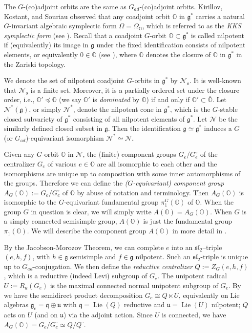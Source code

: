 \documentclass[11pt, a4paper]{amsart}
\newcommand{\g}{\mathfrak{g}}
\newcommand{\orb}{\mathbb{O}}
\newcommand{\fg}{\mathfrak{g}}
\newcommand{\fq}{\mathfrak{q}}
\newcommand{\fu}{\mathfrak{u}}
\newcommand{\cN}{\mathcal{N}}
\DeclareMathOperator{\Lie}{Lie}
\newcommand{\slf}{\mathfrak{sl}}
\theoremstyle{definition}
\numberwithin{equation}{section}
\begin{document}
The $G$-(co)adjoint orbits are the same as $G_{ad}$-(co)adjoint orbits. Kirillov, Kostant, and Souriau observed that any coadjoint orbit $\orb$ in $\fg^*$ carries a natural $G$-invariant algebraic symplectic form $\Omega=\Omega_\orb$, which is referred to as the \emph{KKS symplectic form} (see \cite[(5.14)(b)]{Vogan_AV}). Recall that a coadjoint $G$-orbit $\orb\subset\g^*$ is called nilpotent if (equivalently) its image in $\g$ under the fixed identification consists of nilpotent elements, or equivalently $0\in\overline{\orb}$ (see \cite[Theorem 5.7]{Vogan_AV}), where $\overline{\orb}$ denotes the closure of $\orb$ in $\g^*$ in the Zariski topology. 

We denote the set of nilpotent coadjoint $G$-orbits in $\g^*$ by $\cN_o$. It is well-known that $\cN_o$ is a finite set. Moreover, it is a partially ordered set under the closure order, i.e., $\orb' \preceq \orb$ (we say $\orb'$ is \emph{dominated} by $\orb$) if and only if $\orb' \subset \overline{\orb}$. 
Let $\cN^*(\g)$, or simply $\cN^*$, denote the nilpotent cone in $\g^*$, which is the $G$-stable closed subvariety of $\g^*$ consisting of all nilpotent elements of $\g^*$. Let $\cN$ be the similarly defined closed subset in $\g$. Then the identification $\g \simeq \g^*$ induces a $G$ (or $G_{ad}$)-equivariant isomorphism $\cN^* \simeq \cN$. 


Given any $G$-orbit $\orb$ in $\cN$, the (finite) component groups $G_e/G_e^\circ$ of the centralizer $G_e$ of various $e \in \orb$ are all isomorphic to each other and the isomorphisms are unique up to composition with some inner automorphisms of the groups. Therefore we can define the {\it ($G$-equivariant) component group} $A_G(\orb):= G_e/G_e^\circ$ of $\orb$ by abuse of notation and terminology. Then $A_G(\orb)$ is isomorphic to the $G$-equivariant fundamental group $\pi_1^G(\orb)$ of $\orb$. When the group $G$ in question is clear, we will simply write $A(\orb) = A_G(\orb)$. When $G$ is a simply connected semisimple group, $A(\orb)$ is just the fundamental group $\pi_1(\orb)$. We will describe the component group $A(\orb)$ in more detail in .

By the Jacobson-Morozov Theorem, we can complete $e$ into an $\slf_2$–triple $(e,h,f)$, with $h \in \g$ semisimple and $f \in \g$ nilpotent. Such an $\slf_2$-triple is unique up to $G_{ad}$-conjugation. We then define the \emph{reductive centralizer} $Q:=Z_G(e,h,f)$, 
which is a reductive (indeed Levi) subgroup of $G_e$. The unipotent radical $U:=R_u(G_e)$ is the maximal connected normal unipotent subgroup of $G_e$. By \cite[Proposition 2.4]{BV85:unipotent} we have the semidirect product decomposition $G_e \cong Q \ltimes U$,
equivalently on Lie algebras $\fg_e=\fq \oplus \fu$ with $\fq=\Lie(Q)$ reductive and $\fu=\Lie(U)$ nilpotent; $Q$ acts on $U$ (and on $\fu$) via the adjoint action. Since $U$ is connected, we have $A_G(\orb) = G_e/G_e^\circ \simeq Q/Q^\circ$.
\end{document}
